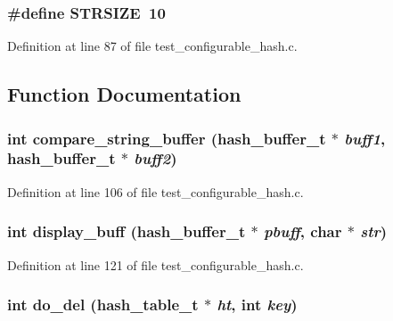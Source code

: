 \subsubsection[{STRSIZE}]{\setlength{\rightskip}{0pt plus 5cm}\#define STRSIZE~10}\label{test__configurable__hash_8c_a29e632a035b9d4c4b6225bb936eb8097}


Definition at line 87 of file test\_\-configurable\_\-hash.c.

\subsection{Function Documentation}
\subsubsection[{compare\_\-string\_\-buffer}]{\setlength{\rightskip}{0pt plus 5cm}int compare\_\-string\_\-buffer (hash\_\-buffer\_\-t $\ast$ {\em buff1}, \/  hash\_\-buffer\_\-t $\ast$ {\em buff2})}\label{test__configurable__hash_8c_af183d0c5e0c482d0f02845db8a2f785c}


Definition at line 106 of file test\_\-configurable\_\-hash.c.
\subsubsection[{display\_\-buff}]{\setlength{\rightskip}{0pt plus 5cm}int display\_\-buff (hash\_\-buffer\_\-t $\ast$ {\em pbuff}, \/  char $\ast$ {\em str})}\label{test__configurable__hash_8c_ad9a0e7d500dc83e14095e7c90c40c5b9}


Definition at line 121 of file test\_\-configurable\_\-hash.c.
\subsubsection[{do\_\-del}]{\setlength{\rightskip}{0pt plus 5cm}int do\_\-del (hash\_\-table\_\-t $\ast$ {\em ht}, \/  int {\em key})}\label{test__configurable__hash_8c_aec7e06cf1eb3d581149a1f9f9efa989f}


